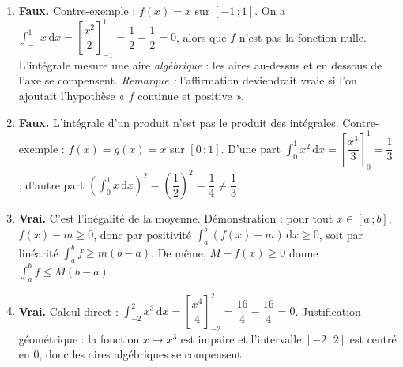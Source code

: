 \documentclass[11pt]{article}
\newcommand{\cle}[1]{{\popxbold\color{popdark}#1}}
\begin{document}
\begin{corrige}
\begin{enumerate}
\item \textbf{Faux.} Contre-exemple : $f(x)=x$ sur $[-1\,;1]$. On a $\displaystyle\int_{-1}^{1} x\,\mathrm{d}x = \left[\dfrac{x^2}{2}\right]_{-1}^{1} = \dfrac{1}{2}-\dfrac{1}{2} = 0$, alors que $f$ n'est pas la fonction nulle. L'intégrale mesure une aire \emph{algébrique} : les aires au-dessus et en dessous de l'axe se compensent.
\emph{Remarque :} l'affirmation deviendrait vraie si l'on ajoutait l'hypothèse « $f$ continue et positive ».
\item \textbf{Faux.} L'intégrale d'un produit n'est pas le produit des intégrales. Contre-exemple : $f(x)=g(x)=x$ sur $[0\,;1]$. D'une part $\displaystyle\int_0^1 x^2\,\mathrm{d}x = \left[\dfrac{x^3}{3}\right]_0^1 = \dfrac{1}{3}$ ; d'autre part $\displaystyle\left(\int_0^1 x\,\mathrm{d}x\right)^2 = \left(\dfrac{1}{2}\right)^2 = \dfrac{1}{4} \neq \dfrac{1}{3}$.
\item \textbf{Vrai.} C'est l'\cle{inégalité de la moyenne}. Démonstration : pour tout $x\in[a\,;b]$, $f(x)-m\ge 0$, donc par positivité $\displaystyle\int_a^b (f(x)-m)\,\mathrm{d}x \ge 0$, soit par linéarité $\displaystyle\int_a^b f \ge m(b-a)$. De même, $M-f(x)\ge 0$ donne $\displaystyle\int_a^b f \le M(b-a)$.
\item \textbf{Vrai.} Calcul direct : $\displaystyle\int_{-2}^{2} x^3\,\mathrm{d}x = \left[\dfrac{x^4}{4}\right]_{-2}^{2} = \dfrac{16}{4}-\dfrac{16}{4} = 0$. Justification géométrique : la fonction $x\mapsto x^3$ est impaire et l'intervalle $[-2\,;2]$ est centré en $0$, donc les aires algébriques se compensent.
\end{enumerate}
\end{corrige}
\end{document}
